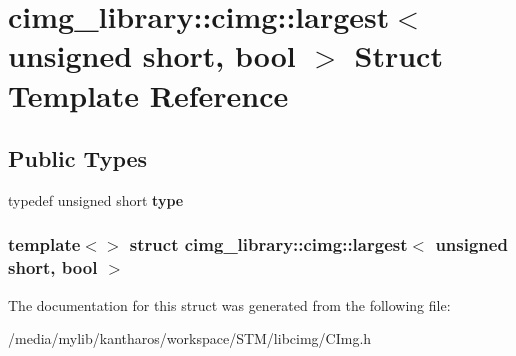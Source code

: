 \hypertarget{structcimg__library_1_1cimg_1_1largest_3_01unsigned_01short_00_01bool_01_4}{
\section{cimg\_\-library::cimg::largest$<$ unsigned short, bool $>$ Struct Template Reference}
\label{structcimg__library_1_1cimg_1_1largest_3_01unsigned_01short_00_01bool_01_4}
}
\subsection*{Public Types}
\begin{DoxyCompactItemize}
\item 
\hypertarget{structcimg__library_1_1cimg_1_1largest_3_01unsigned_01short_00_01bool_01_4_a49a0a9f433ffcae83376e698b8bbd919}{
typedef unsigned short {\bfseries type}}
\label{structcimg__library_1_1cimg_1_1largest_3_01unsigned_01short_00_01bool_01_4_a49a0a9f433ffcae83376e698b8bbd919}

\end{DoxyCompactItemize}
\subsubsection*{template$<$$>$ struct cimg\_\-library::cimg::largest$<$ unsigned short, bool $>$}



The documentation for this struct was generated from the following file:\begin{DoxyCompactItemize}
\item 
/media/mylib/kantharos/workspace/STM/libcimg/CImg.h\end{DoxyCompactItemize}
